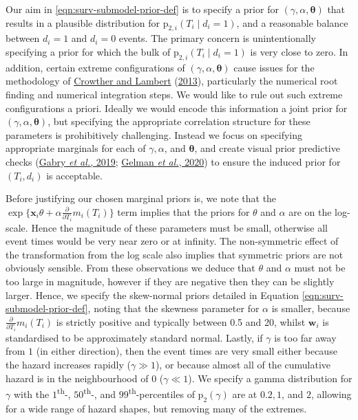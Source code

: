 \documentclass[
  10pt,
  a4paper,
]{article}
\newcommand{\pd}{\text{p}}
\begin{document}
Our aim in \eqref{eqn:surv-submodel-prior-def} is to specify a prior for
\((\gamma, \alpha, \boldsymbol{\theta})\) that results in a plausible
distribution for \(\pd_{2, i}(T_{i} \mid d_{i} = 1)\), and a reasonable
balance between \(d_{i} = 1\) and \(d_{i} = 0\) events. The primary
concern is unintentionally specifying a prior for which the bulk of
\(\pd_{2, i}(T_{i} \mid d_{i} = 1)\) is very close to zero. In addition,
certain extreme configurations of
\((\gamma, \alpha, \boldsymbol{\theta})\) cause issues for the
methodology of \protect\hyperlink{ref-crowther_simulating_2013}{Crowther
and Lambert} (\protect\hyperlink{ref-crowther_simulating_2013}{2013}),
particularly the numerical root finding and numerical integration steps.
We would like to rule out such extreme configurations a priori. Ideally
we would encode this information a joint prior for
\((\gamma, \alpha, \boldsymbol{\theta})\), but specifying the
appropriate correlation structure for these parameters is prohibitively
challenging. Instead we focus on specifying appropriate marginals for
each of \(\gamma, \alpha\), and \(\boldsymbol{\theta}\), and create
visual prior predictive checks
(\protect\hyperlink{ref-gabry_visualization_2019}{Gabry \emph{et al.},
2019}; \protect\hyperlink{ref-gelman_bayesian_2020}{Gelman \emph{et
al.}, 2020}) to ensure the induced prior for \((T_{i}, d_{i})\) is
acceptable.

Before justifying our chosen marginal priors is, we note that the
\(\exp\{\boldsymbol{x}_{i}\theta + \alpha \frac{\partial}{\partial T_{i}} m_{i}(T_{i})\}\)
term implies that the priors for \(\theta\) and \(\alpha\) are on the
log-scale. Hence the magnitude of these parameters must be small,
otherwise all event times would be very near zero or at infinity. The
non-symmetric effect of the transformation from the log scale also
implies that symmetric priors are not obviously sensible. From these
observations we deduce that \(\theta\) and \(\alpha\) must not be too
large in magnitude, however if they are negative then they can be
slightly larger. Hence, we specify the skew-normal priors detailed in
Equation \eqref{eqn:surv-submodel-prior-def}, noting that the skewness
parameter for \(\alpha\) is smaller, because
\(\frac{\partial}{\partial T_{i}} m_{i}(T_{i})\) is strictly positive
and typically between 0.5 and 20, whilst \(\boldsymbol{w}_{i}\) is
standardised to be approximately standard normal. Lastly, if \(\gamma\)
is too far away from \(1\) (in either direction), then the event times
are very small either because the hazard increases rapidly
(\(\gamma \gg 1\)), or because almost all of the cumulative hazard is in
the neighbourhood of 0 (\(\gamma \ll 1\)). We specify a gamma
distribution for \(\gamma\) with the \(1\)\textsuperscript{th}-,
\(50\)\textsuperscript{th}-, and \(99\)\textsuperscript{th}-percentiles
of \(\pd_{2}(\gamma)\) are at \(0.2, 1\), and \(2\), allowing for a wide
range of hazard shapes, but removing many of the extremes.
\end{document}
